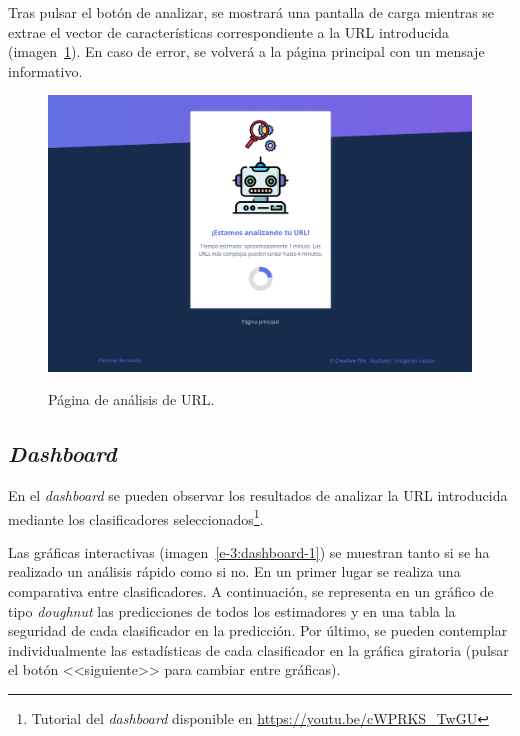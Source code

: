 Tras pulsar el botón de analizar, se mostrará una pantalla de carga mientras se extrae el vector de características correspondiente a la URL introducida (imagen~\ref{e-1:analysis}). En caso de error, se volverá a la página principal con un mensaje informativo.

\begin{figure}[h]
	\caption[Manual de usuario: página de carga]{Página de análisis de URL.}
	\centering
	\includegraphics[width=\textwidth]{../img/anexos/user_guide/2_analysis}
	\label{e-1:analysis}
\end{figure}

\subsection{\textit{Dashboard}}
\label{s-e:dashboard}

En el \textit{dashboard} se pueden observar los resultados de analizar la URL introducida mediante los clasificadores seleccionados\footnote{Tutorial del \textit{dashboard} disponible en \url{https://youtu.be/cWPRKS_TwGU}}.

Las gráficas interactivas (imagen~\ref{e-3:dashboard-1}) se muestran tanto si se ha realizado un análisis rápido como si no. En un primer lugar se realiza una comparativa entre clasificadores. A continuación, se representa en un gráfico de tipo \textit{doughnut} las predicciones de todos los estimadores y en una tabla la seguridad de cada clasificador en la predicción. Por último, se pueden contemplar individualmente las estadísticas de cada clasificador en la gráfica giratoria (pulsar el botón <<siguiente>> para cambiar entre gráficas).

